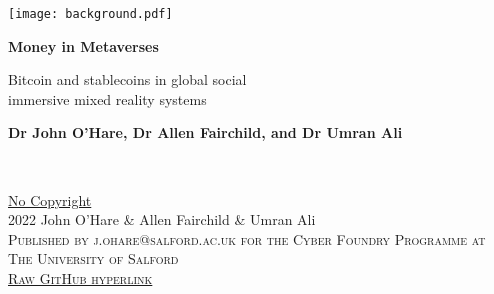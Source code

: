 \documentclass[
	12pt, %
	fleqn, %
	a4paper, %
	oneside, %
]{LegrandOrangeBook}
\begin{document}

\titlepage %
	{\texttt{[image: background.pdf]}} %
	{ %
		\centering\sffamily %
		{\Huge\bfseries Money in Metaverses\par} %
		\vspace{16pt} %
		{\LARGE Bitcoin and stablecoins in global social \\immersive mixed reality systems\par} %
		\vspace{24pt} %
		{\large \textbf{Dr John O'Hare, Dr Allen Fairchild, and Dr Umran Ali}\par} %
	}


\thispagestyle{empty} %

~\vfill %

\noindent \href{https://creativecommons.org/publicdomain/zero/1.0/}{No Copyright}\\ 2022 John O'Hare \& Allen Fairchild \& Umran Ali\\ %

\noindent \textsc{Published by j.ohare@salford.ac.uk for the Cyber Foundry Programme at The University of Salford}\\ %

\noindent \textsc{\href{https://raw.githubusercontent.com/GMCyberFoundry/Metaverse/main/Paper/metaverseBTC.pdf}{Raw GitHub hyperlink}}\\ %
\end{document}
